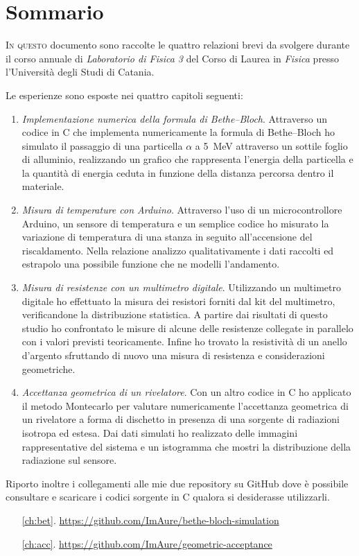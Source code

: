 \chapter{Sommario}
    \lettrine[loversize=0.08, lines=2]{I}{n questo} documento sono raccolte le quattro relazioni brevi da svolgere durante il corso annuale di \emph{Laboratorio di Fisica 3} del Corso di Laurea in \emph{Fisica} presso l'Università degli Studi di Catania.

    Le esperienze sono esposte nei quattro capitoli seguenti:
    \begin{enumerate}
        \item \emph{Implementazione numerica della formula di Bethe--Bloch}. Attraverso un codice in C che implementa numericamente la formula di Bethe--Bloch ho simulato il passaggio di una particella $\alpha$ a \SI{5}{\mega\eV} attraverso un sottile foglio di alluminio, realizzando un grafico che rappresenta l'energia della particella e la quantità di energia ceduta in funzione della distanza percorsa dentro il materiale.
        \item \emph{Misura di temperature con Arduino}. Attraverso l'uso di un microcontrollore Arduino, un sensore di temperatura e un semplice codice ho misurato la variazione di temperatura di una stanza in seguito all'accensione del riscaldamento. Nella relazione analizzo qualitativamente i dati raccolti ed estrapolo una possibile funzione che ne modelli l'andamento.
        \item \emph{Misura di resistenze con un multimetro digitale}. Utilizzando un multimetro digitale ho effettuato la misura dei resistori forniti dal kit del multimetro, verificandone la distribuzione statistica. A partire dai risultati di questo studio ho confrontato le misure di alcune delle resistenze collegate in parallelo con i valori previsti teoricamente. Infine ho trovato la resistività di un anello d'argento sfruttando di nuovo una misura di resistenza e considerazioni geometriche.
        \item \emph{Accettanza geometrica di un rivelatore}. Con un altro codice in C ho applicato il metodo Montecarlo per valutare numericamente l'accettanza geometrica di un rivelatore a forma di dischetto in presenza di una sorgente di radiazioni isotropa ed estesa. Dai dati simulati ho realizzato delle immagini rappresentative del sistema e un istogramma che mostri la distribuzione della radiazione sul sensore.
    \end{enumerate}
    
    Riporto inoltre i collegamenti alle mie due repository su GitHub dove è possibile consultare e scaricare i codici sorgente in C qualora si desiderasse utilizzarli.
    \begin{enumerate}
        \item[\ref{ch:bet}.] \url{https://github.com/ImAure/bethe-bloch-simulation}
        \item[\ref{ch:acc}.] \url{https://github.com/ImAure/geometric-acceptance}
    \end{enumerate}

